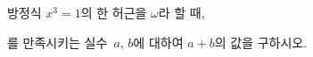 방정식 $x^3=1$의 한 허근을 $\omega$라 할 때, \par\smallskip{}\par\smallskip\noindent 를 만족시키는 실수~$a$, $b$에 대하여 $a+b$의 값을 구하시오.
